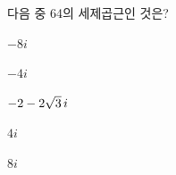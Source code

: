 다음 중 64의 세제곱근인 것은? 
\begin{choices32}{\rule[-3ex]{0pt}{8ex}$-8i$}{\rule[-3ex]{0pt}{8ex}$-4i$}{\rule[-3ex]{0pt}{8ex}$-2-2\sqrt{3}\mkern3mu i$}{\rule[-3ex]{0pt}{8ex}$4i$}{\rule[-3ex]{0pt}{8ex}$8i$}\end{choices32}
